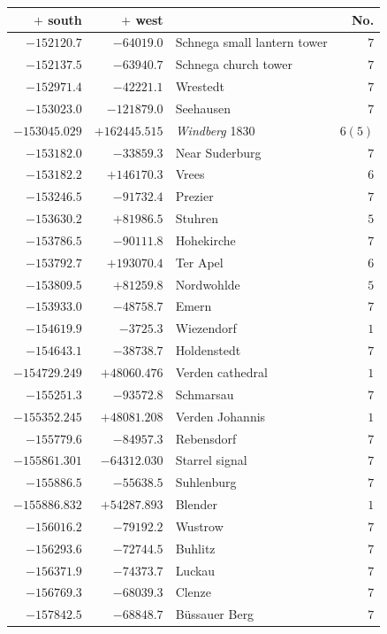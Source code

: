 \begin{center}\begingroup\fontsize{8}{9}\selectfont
\setlength{\tabcolsep}{4pt}
\begin{tabular}{r|r|p{170pt}|r}\hline
\(+\) south&\(+\) west&&No.\\\hline
\(-152120.7\)&\(-64019.0\)&Schnega small lantern tower&\(7\)\\
\(-152137.5\)&\(-63940.7\)&Schnega church tower&\(7\)\\
\(-152971.4\)&\(-42221.1\)&Wrestedt&\(7\)\\
\(-153023.0\)&\(-121879.0\)&Seehausen&\(7\)\\
\(-153045.029\)&\(+162445.515\)&\textit{Windberg} 1830&\(6 (5)\)\\
\(-153182.0\)&\(-33859.3\)&Near Suderburg&\(7\)\\
\(-153182.2\)&\(+146170.3\)&Vrees&\(6\)\\
\(-153246.5\)&\(-91732.4\)&Prezier&\(7\)\\
\(-153630.2\)&\(+81986.5\)&Stuhren&\(5\)\\
\(-153786.5\)&\(-90111.8\)&Hohekirche&\(7\)\\
\(-153792.7\)&\(+193070.4\)&Ter Apel&\(6\)\\
\(-153809.5\)&\(+81259.8\)&Nordwohlde&\(5\)\\
\(-153933.0\)&\(-48758.7\)&Emern&\(7\)\\
\(-154619.9\)&\(-3725.3\)&Wiezendorf&\(1\)\\
\(-154643.1\)&\(-38738.7\)&Holdenstedt&\(7\)\\
\(-154729.249\)&\(+48060.476\)&Verden cathedral&\(1\)\\
\(-155251.3\)&\(-93572.8\)&Schmarsau&\(7\)\\
\(-155352.245\)&\(+48081.208\)&Verden Johannis&\(1\)\\
\(-155779.6\)&\(-84957.3\)&Rebensdorf&\(7\)\\
\(-155861.301\)&\(-64312.030\)&Starrel signal&\(7\)\\
\(-155886.5\)&\(-55638.5\)&Suhlenburg&\(7\)\\
\(-155886.832\)&\(+54287.893\)&Blender&\(1\)\\
\(-156016.2\)&\(-79192.2\)&Wustrow&\(7\)\\
\(-156293.6\)&\(-72744.5\)&Buhlitz&\(7\)\\
\(-156371.9\)&\(-74373.7\)&Luckau&\(7\)\\
\(-156769.3\)&\(-68039.3\)&Clenze&\(7\)\\
\(-157842.5\)&\(-68848.7\)&Büssauer Berg&\(7\)\\

\end{tabular}
\end{center}
